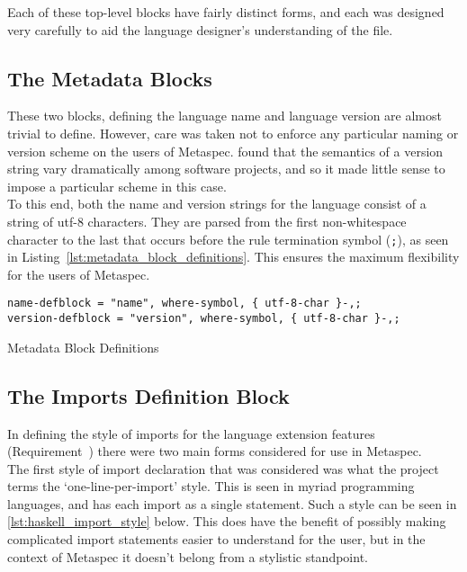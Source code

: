 Each of these top-level blocks have fairly distinct forms, and each was designed very carefully to aid the language designer's understanding of the file.

\subsection{The Metadata Blocks} %
\label{sub:the_metadata_blocks}
These two blocks, defining the language name and language version are almost trivial to define. 
However, care was taken not to enforce any particular naming or version scheme on the users of Metaspec.
\citet{raemaekers2014semantic} found that the semantics of a version string vary dramatically among software projects, and so it made little sense to impose a particular scheme in this case. \\

To this end, both the name and version strings for the language consist of a string of utf-8 characters.
They are parsed from the first non-whitespace character to the last that occurs before the rule termination symbol (\texttt{;}), as seen in Listing~\ref{lst:metadata_block_definitions}.
This ensures the maximum flexibility for the users of Metaspec. 

\begin{listing}[!htb]
\begin{verbatim}
name-defblock = "name", where-symbol, { utf-8-char }-,;
version-defblock = "version", where-symbol, { utf-8-char }-,;
\end{verbatim}
\caption{Metadata Block Definitions}
\label{lst:metadata_block_definitions}
\end{listing}


\subsection{The Imports Definition Block} %
\label{sub:the_imports_definition_block}
In defining the style of imports for the language extension features (Requirement~) there were two main forms considered for use in Metaspec.\\

The first style of import declaration that was considered was what the project terms the `one-line-per-import' style. 
This is seen in myriad programming languages, and has each import as a single statement. 
Such a style can be seen in \autoref{lst:haskell_import_style} below.
This does have the benefit of possibly making complicated import statements easier to understand for the user, but in the context of Metaspec it doesn't belong from a stylistic standpoint.

